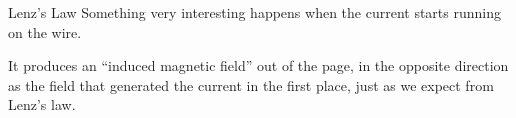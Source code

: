 \documentclass[12pt,aspectratio=169]{beamer}
\begin{document}
%    



\begin{frame}{Lenz's Law}
  Something very interesting happens when the current starts running on the
  wire.
  \begin{center}
  \end{center}
  It produces an ``induced magnetic field'' out of the page, in the opposite
  direction as the field that generated the current in the first place, just
  as we expect from Lenz's law.
\end{frame}
\end{document}
